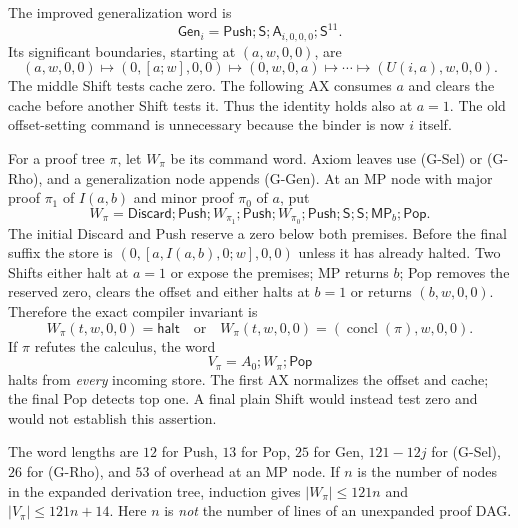 The improved generalization word is
\[
 \mathsf{Gen}_i=\mathsf{Push};\mathsf S;
                       \mathsf A_{i,0,0,0};\mathsf S^{11}. \tag{G-Gen}
\]
Its significant boundaries, starting at $(a,w,0,0)$, are
\[
 (a,w,0,0)\longmapsto(0,[a;w],0,0)
 \longmapsto(0,w,0,a)
 \longmapsto\cdots\longmapsto(U(i,a),w,0,0).
\]
The middle Shift tests cache zero.  The following AX consumes $a$ and
clears the cache before another Shift tests it.  Thus the identity holds
also at $a=1$.  The old offset-setting command is unnecessary because
the binder is now $i$ itself.

For a proof tree $\pi$, let $W_\pi$ be its command word.  Axiom leaves
use (G-Sel) or (G-Rho), and a generalization node appends (G-Gen).
At an MP node with major proof $\pi_1$ of $I(a,b)$ and minor proof
$\pi_0$ of $a$, put
\[
 W_\pi=\mathsf{Discard};\mathsf{Push};W_{\pi_1};
 \mathsf{Push};W_{\pi_0};\mathsf{Push};
           \mathsf S;\mathsf S;\mathsf{MP}_b;\mathsf{Pop}.
\]
The initial Discard and Push reserve a zero below both premises.  Before
the final suffix the store is $(0,[a,I(a,b),0;w],0,0)$ unless it
has already halted.  Two Shifts either halt at $a=1$ or expose
the premises; MP returns $b$; Pop removes the reserved zero, clears
the offset and either halts at $b=1$ or returns $(b,w,0,0)$.
Therefore the exact compiler invariant is
\[
 W_\pi(t,w,0,0)=\mathsf{halt}
 \quad\text{or}\quad
 W_\pi(t,w,0,0)=(\operatorname{concl}(\pi),w,0,0).       \tag{G-Cmp}
\]
If $\pi$ refutes the calculus, the word
\[
                 V_\pi=A_0;W_\pi;\mathsf{Pop}             \tag{G-Ref}
\]
halts from \emph{every} incoming store.  The first AX normalizes the
offset and cache; the final Pop detects top one.  A final plain Shift
would instead test zero and would not establish this assertion.

The word lengths are $12$ for Push, $13$ for Pop, $25$ for Gen,
$121-12j$ for (G-Sel), $26$ for (G-Rho), and $53$ of overhead at
an MP node.  If $n$ is the number of nodes in the expanded derivation
tree, induction gives $|W_\pi|\le121n$ and $|V_\pi|\le121n+14$.
Here $n$ is \emph{not} the number of lines of an unexpanded proof DAG.

